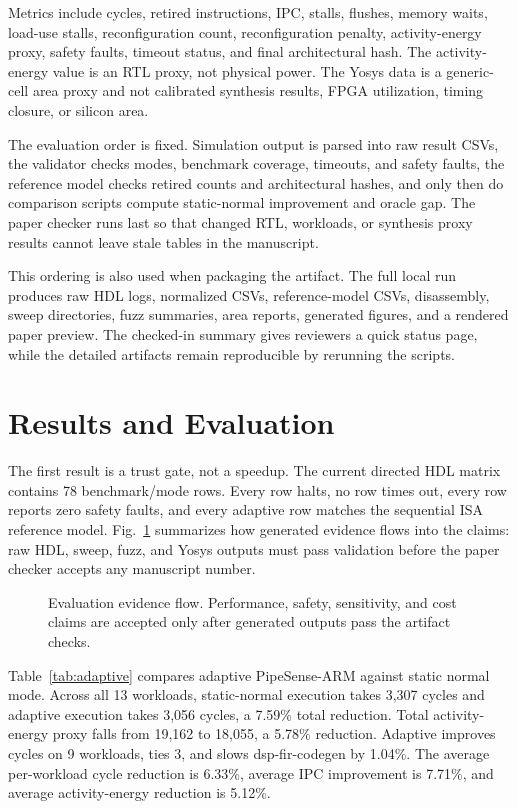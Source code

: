 \documentclass[conference]{IEEEtran}
\newcommand{\pipesense}{PipeSense-ARM}
\begin{document}
Metrics include cycles, retired instructions, IPC, stalls, flushes, memory waits, load-use stalls, reconfiguration count, reconfiguration penalty, activity-energy proxy, safety faults, timeout status, and final architectural hash. The activity-energy value is an RTL proxy, not physical power. The Yosys data is a generic-cell area proxy and not calibrated synthesis results, FPGA utilization, timing closure, or silicon area.

The evaluation order is fixed. Simulation output is parsed into raw result CSVs, the validator checks modes, benchmark coverage, timeouts, and safety faults, the reference model checks retired counts and architectural hashes, and only then do comparison scripts compute static-normal improvement and oracle gap. The paper checker runs last so that changed RTL, workloads, or synthesis proxy results cannot leave stale tables in the manuscript.

This ordering is also used when packaging the artifact. The full local run produces raw HDL logs, normalized CSVs, reference-model CSVs, disassembly, sweep directories, fuzz summaries, area reports, generated figures, and a rendered paper preview. The checked-in summary gives reviewers a quick status page, while the detailed artifacts remain reproducible by rerunning the scripts.

\section{Results and Evaluation}

The first result is a trust gate, not a speedup. The current directed HDL matrix contains 78 benchmark/mode rows. Every row halts, no row times out, every row reports zero safety faults, and every adaptive row matches the sequential ISA reference model. Fig.~\ref{fig:evidence} summarizes how generated evidence flows into the claims: raw HDL, sweep, fuzz, and Yosys outputs must pass validation before the paper checker accepts any manuscript number.

\begin{figure}[t]
\centering

\caption{Evaluation evidence flow. Performance, safety, sensitivity, and cost claims are accepted only after generated outputs pass the artifact checks.}
\label{fig:evidence}
\end{figure}

Table~\ref{tab:adaptive} compares adaptive \pipesense{} against static normal mode. Across all 13 workloads, static-normal execution takes 3,307 cycles and adaptive execution takes 3,056 cycles, a 7.59\% total reduction. Total activity-energy proxy falls from 19,162 to 18,055, a 5.78\% reduction. Adaptive improves cycles on 9 workloads, ties 3, and slows dsp-fir-codegen by 1.04\%. The average per-workload cycle reduction is 6.33\%, average IPC improvement is 7.71\%, and average activity-energy reduction is 5.12\%.
\end{document}
